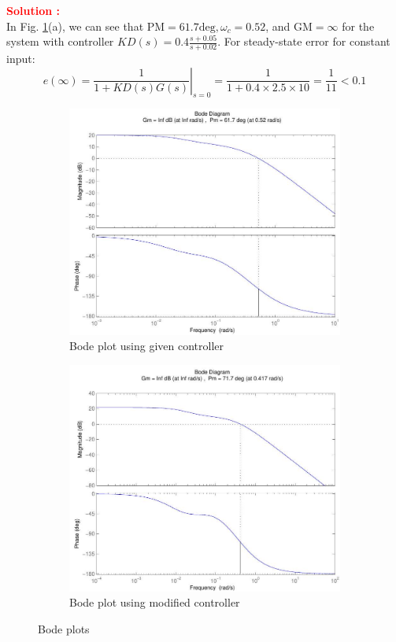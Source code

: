 \documentclass[12pt]{article}
\begin{document}
\textbf{\textcolor{red}{Solution :}} \\


In Fig. \ref{fig:prb23}(a), we can see that \(\mathrm{PM}=61.7 \mathrm{deg}, \omega_{c}=0.52\), and \(\mathrm{GM}=\infty\) for the system with controller $ K D(s)=0.4 \frac{s+0.05}{s+0.02}$. For steady-state error for constant input:
\[
e(\infty)=\left.\frac{1}{1+K D(s) G(s)}\right|_{s=0}=\frac{1}{1+0.4 \times 2.5 \times 10}=\frac{1}{11}<0.1
\]
\begin{figure}[h!]
    \centering
    \begin{subfigure}[b]{0.45\textwidth}
    \centering
    \includegraphics[width=\textwidth]{figs/6.12-1.jpg}
     \caption{Bode plot using given controller}
     \end{subfigure}
     \begin{subfigure}[b]{0.45\textwidth}
     \centering
        \includegraphics[width=\textwidth]{figs/6.12-2.jpg}
        \caption{Bode plot using modified controller}
     \end{subfigure}
     \caption{Bode plots} \label{fig:prb23}
\end{figure}
\clearpage
\end{document}
